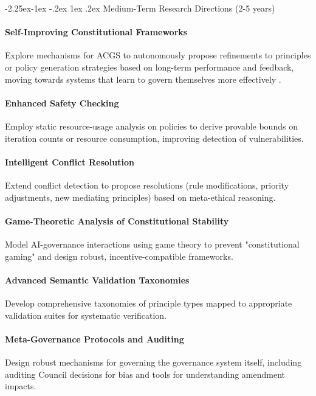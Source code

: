 \documentclass[manuscript,screen,9pt]{acmart}
\makeatletter
\renewcommand\subsection{\@startsection{subsection}{2}{\z@}%
  {-2.25ex\@plus -1ex \@minus -.2ex}%
  {1ex \@plus .2ex}%
  {\normalfont\large\bfseries}}
\makeatother
\begin{document}
\subsection{Medium-Term Research Directions (2-5 years)}
\label{subsec:medium_term_research}
\paragraph{Self-Improving Constitutional Frameworks} Explore mechanisms for ACGS to autonomously propose refinements to principles or policy generation strategies based on long-term performance and feedback, moving towards systems that learn to govern themselves more effectively \cite{Zhao2025AbsoluteZero}.

\paragraph{Enhanced Safety Checking} Employ static resource-usage analysis on policies to derive provable bounds on iteration counts or resource consumption, improving detection of vulnerabilities.

\paragraph{Intelligent Conflict Resolution} Extend conflict detection to propose resolutions (rule modifications, priority adjustments, new mediating principles) based on meta-ethical reasoning.

\paragraph{Game-Theoretic Analysis of Constitutional Stability} Model AI-governance interactions using game theory to prevent "constitutional gaming" and design robust, incentive-compatible frameworks.

\paragraph{Advanced Semantic Validation Taxonomies} Develop comprehensive taxonomies of principle types mapped to appropriate validation suites for systematic verification.

\paragraph{Meta-Governance Protocols and Auditing} Design robust mechanisms for governing the governance system itself, including auditing Council decisions for bias and tools for understanding amendment impacts.
\end{document}
